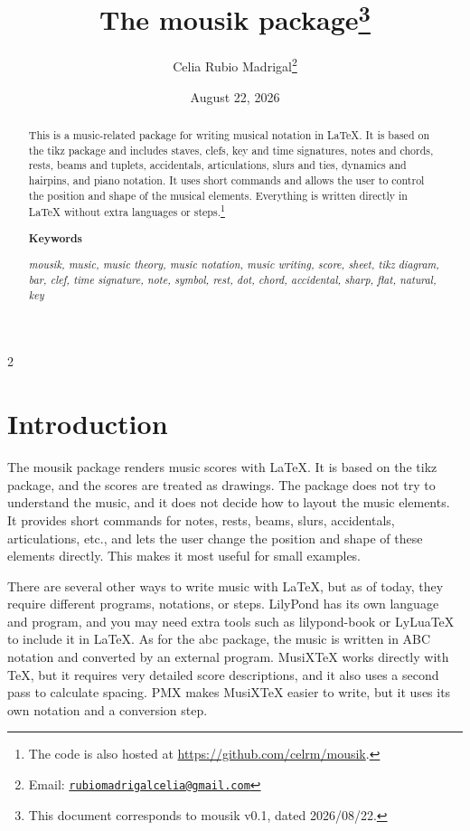 \documentclass[final]{article}
\title{The \textsf{mousik} package\footnote{This
		document corresponds to \textsf{mousik} v0.1, dated 2026/08/22.}}
\author{Celia Rubio Madrigal\footnote{Email: \href{mailto:rubiomadrigalcelia@gmail.com}{\texttt{rubiomadrigalcelia@gmail.com}}}}
\date{August 22, 2026}
\begin{document}
	
	\maketitle
	
	\begin{abstract}
        This is a music-related package for writing musical notation in \LaTeX{}. It is based on the \textsf{tikz} package and includes staves, clefs, key and time signatures, notes and chords, rests, beams and tuplets, accidentals, articulations, slurs and ties, dynamics and hairpins, and piano notation. It uses short commands and allows the user to control the position and shape of the musical elements. Everything is written directly in \LaTeX{} without extra languages or steps.\footnote{The code is also hosted at \href{https://github.com/celrm/mousik}{https://github.com/celrm/mousik}.}
        
        \begin{center}
            \textbf{Keywords}
        \end{center}
        
        \textit{mousik, music, music theory, music notation, music writing, score, sheet, tikz diagram, bar, clef, time signature, note, symbol, rest, dot, chord, accidental, sharp, flat, natural, key}
    \end{abstract}

	\vfill
	\begin{multicols}{2}
		\tableofcontents
	\end{multicols}
	\vfill
	
	\section{Introduction}\label{intro}

    The \textsf{mousik} package renders music scores with \LaTeX{}. It is based on the \textsf{tikz} package, and the scores are treated as drawings. The package does not try to understand the music, and it does not decide how to layout the music elements. It provides short commands for notes, rests, beams, slurs, accidentals, articulations, etc., and lets the user change the position and shape of these elements directly. This makes it most useful for small examples.

    There are several other ways to write music with \LaTeX{}, but as of today, they require different programs, notations, or steps. \textsf{LilyPond} has its own language and program, and you may need extra tools such as \textsf{lilypond-book} or \textsf{LyLuaTeX} to include it in \LaTeX{}. As for the \textsf{abc} package, the music is written in ABC notation and converted by an external program. \textsf{MusiXTeX} works directly with TeX, but it requires very detailed score descriptions, and it also uses a second pass to calculate spacing. \textsf{PMX} makes MusiXTeX easier to write, but it uses its own notation and a conversion step.
\end{document}

